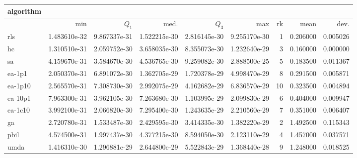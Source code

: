 \begin{tabular}{@{}l*{5}{>{{}}N{1}{1}}>{{}}N{2}{0}>{{}}N{1}{2}>{{}}N{1}{2}@{}}
\toprule
{algorithm} &  &  \\
\midrule
& {min} & {$Q_1$} & {med.} & {$Q_3$} & {max} & {rk} & {mean} & {dev.} \\
\midrule
rls & {\color{blue}} 1.483610e-32 & {\color{blue}} 9.867337e-31 & {\color{blue}} 1.522215e-30 & {\color{blue}} 2.816145e-30 & {\color{blue}} 9.255170e-30 & 1 & 0.206000 & 0.005026 \\
 hc & 1.310510e-31 & 2.059752e-30 & 3.658035e-30 & 8.355073e-30 & 1.232640e-29 & 3 & 0.160000 & 0.000000 \\
 sa & 4.159670e-31 & 3.584670e-30 & 4.536765e-30 & 9.259082e-30 & 2.888500e-25 & 5 & 0.183500 & 0.011367 \\
 ea-1p1 & 2.050370e-31 & 6.891072e-30 & 1.362705e-29 & 1.720378e-29 & 4.998470e-29 & 8 & 0.291500 & 0.005871 \\
 ea-1p10 & 2.565570e-31 & 7.308730e-30 & 2.992075e-29 & 4.162682e-29 & 6.836570e-29 & 10 & 0.323500 & 0.004894 \\
 ea-10p1 & 7.963300e-31 & 3.962105e-30 & 7.263680e-30 & 1.103995e-29 & 2.099830e-29 & 6 & 0.404000 & 0.009947 \\
 ea-1c10 & 3.992100e-31 & 2.066820e-30 & 7.295400e-30 & 1.243635e-29 & 2.210560e-29 & 7 & 0.351000 & 0.006407 \\
 ga & 2.720780e-31 & 1.533487e-30 & 2.429595e-30 & 3.414335e-30 & 1.382220e-29 & 2 & 1.492500 & 0.115343 \\
 pbil & 4.574500e-31 & 1.997437e-30 & 4.377215e-30 & 8.594050e-30 & 2.123110e-29 & 4 & 1.457000 & 0.037571 \\
 umda & 1.416310e-30 & 1.296881e-29 & 2.644800e-29 & 5.522843e-29 & 1.368440e-28 & 9 & 1.248000 & 0.018525 \\
 \bottomrule
\end{tabular}
